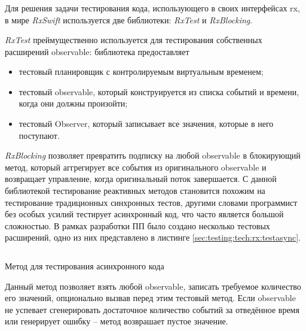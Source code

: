\subsubsection{}
\label{sec:testing:tech:rx}

Для решения задачи тестирования кода, использующего в своих интерфейсах \gls{rx}, в мире \textit{RxSwift} используется две библиотеки: \textit{RxTest} и \textit{RxBlocking}.

\textit{RxTest} преймущественно используется для тестирования собственных расширений \gls{observable}: библиотека предоставляет

\begin{itemize}
	\item тестовый планировщик с контролируемым виртуальным временем;
	\item тестовый \gls{observable}, который конструируется из списка событий и времени, когда они должны произойти;
	\item тестовый Observer, который записывает все значения, которые в него поступают.
\end{itemize}

\textit{RxBlocking} позволяет превратить подписку на любой \gls{observable} в блокирующий метод, который аггрегирует все события из оригинального \gls{observable} и возвращает управление, когда оригинальный поток завершается. С данной библиотекой тестирование реактивных методов становится похожим на тестирование традиционных синхронных тестов, другими словами программист без особых усилий тестирует асинхронный код, что часто является большой сложностью. В рамках разработки ПП было создано несколько тестовых расширений, одно из них представлено в листинге \ref{sec:testing:tech:rx:testasync}.

\begin{code}[h!]
  \inputminted{swift}{inc/src/testasync.swift}
   \caption{Метод для тестирования асинхронного кода}
   \label{sec:testing:tech:rx:testasync}
\end{code}

Данный метод позволяет взять любой \gls{observable}, записать требуемое количество его значений, опционально вызвав перед этим тестовый метод. Если \gls{observable} не успевает сгенерировать достаточное количество событий за отведённое время или генерирует ошибку -- метод возврашает пустое значение.